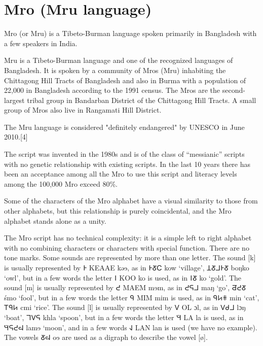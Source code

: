 \section{Mro (Mru language)}

\newfontfamily{}
\def\textmro#1{{\mro #1\xspace}}

 Mro (or Mru) is a Tibeto-Burman language spoken primarily in Bangladesh with a few
speakers in India. 

Mru is a Tibeto-Burman language and one of the recognized languages of Bangladesh. It is spoken by a community of Mros (Mru) inhabiting the Chittagong Hill Tracts of Bangladesh and also in Burma with a population of 22,000 in Bangladesh according to the 1991 census. The Mros are the second-largest tribal group in Bandarban District of the Chittagong Hill Tracts. A small group of Mros also live in Rangamati Hill District.

The Mru language is considered "definitely endangered" by UNESCO in June 2010.[4]

The script was invented in the 1980s and is of the class of “messianic”
scripts with no genetic relationship with existing scripts. In the last 10 years there has been an acceptance
among all the Mro to use this script and literacy levels among the 100,000 Mro exceed 80\%.

Some of the characters of the Mro alphabet have a visual similarity to those from other alphabets, but this
relationship is purely coincidental, and the Mro alphabet stands alone as a unity.


The Mro script has no technical complexity: it is a simple left to right alphabet with no
combining characters or characters with special function. There are no tone marks. Some sounds are
represented by more than one letter. The sound [k] is usually represented by \textmro{𖩌} KEAAE kəɘ, as in \textmro{𖩌𖩑𖩗} kow
‘village’, \textmro{𖩄𖩑𖩁𖩌𖩑} boŋko ‘owl’, but in a few words the letter 𖩙 KOO ko is used, as in \textmro{𖩙𖩑} ko ‘gold’. The sound
[m] is usually represented by \textmro{𖩎} MAEM mɘm, as in \textmro{𖩎𖩆𖩁} maŋ ‘go’, \textmro{𖩔𖩎𖩑} śmo ‘fool’, but in a few words the
letter \textmro{𖩃} MIM mim is used, as in \textmro{𖩃𖩊𖩏} min ‘cat’, \textmro{𖩋𖩃𖩊} cmi ‘rice’. The sound [l] is usually represented by \textmro{𖩍} OL
\textmro{ɔl}, as in \textmro{𖩍𖩝𖩁} lɔŋ ‘boat’, \textmro{𖩈𖩍𖩆} khla ‘spoon’, but in a few words the letter \textmro{𖩛} LA la is used, as in \textmro{𖩛𖩆𖩎𖩖} lamɘ
‘moon’, and in a few words \textmro{𖩚} LAN lan is used (we have no example). The vowels \textmro{𖩑𖩖} oɘ are used as a
digraph to describe the vowel [ø].

